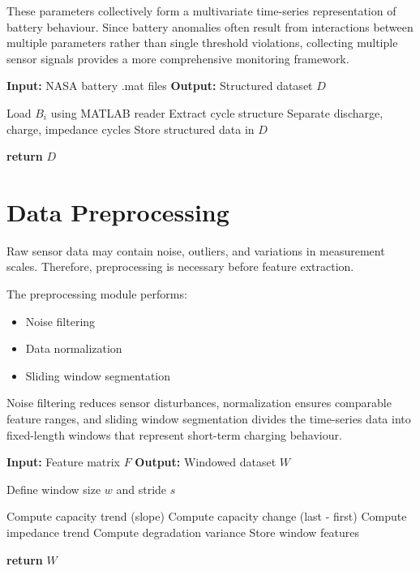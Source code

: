 These parameters collectively form a multivariate time-series representation of battery behaviour. Since battery anomalies often result from interactions between multiple parameters rather than single threshold violations, collecting multiple sensor signals provides a more comprehensive monitoring framework.

\begin{algorithm}
\caption{Battery Data Loading}
\begin{algorithmic}
\STATE \textbf{Input:} NASA battery .mat files
\STATE \textbf{Output:} Structured dataset $D$

    \STATE Load $B_i$ using MATLAB reader
    \STATE Extract cycle structure
    \STATE Separate discharge, charge, impedance cycles
    \STATE Store structured data in $D$
\ENDFOR

\STATE \textbf{return} $D$
\end{algorithmic}
\end{algorithm}

\section{Data Preprocessing}

Raw sensor data may contain noise, outliers, and variations in measurement scales. Therefore, preprocessing is necessary before feature extraction.

The preprocessing module performs:

\begin{itemize}
\item Noise filtering
\item Data normalization
\item Sliding window segmentation
\end{itemize}

Noise filtering reduces sensor disturbances, normalization ensures comparable feature ranges, and sliding window segmentation divides the time-series data into fixed-length windows that represent short-term charging behaviour.

\begin{algorithm}
\caption{Sliding Window Degradation Modeling}
\begin{algorithmic}
\STATE \textbf{Input:} Feature matrix $F$
\STATE \textbf{Output:} Windowed dataset $W$

\STATE Define window size $w$ and stride $s$

        \STATE Compute capacity trend (slope)
        \STATE Compute capacity change (last - first)
        \STATE Compute impedance trend
        \STATE Compute degradation variance
        \STATE Store window features
    \ENDFOR
\ENDFOR

\STATE \textbf{return} $W$
\end{algorithmic}
\end{algorithm}

